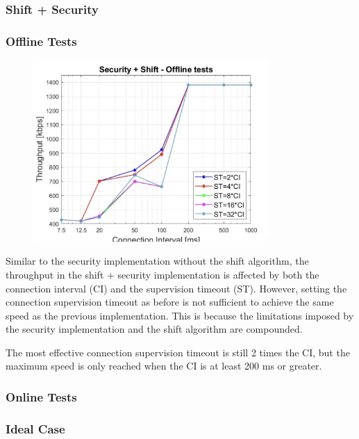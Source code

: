 \documentclass{Configuration_Files/PoliMi3i_thesis}
\begin{document}
\subsubsection*{Shift + Security}
\subsubsection*{Offline Tests}

\begin{figure}[H]
    \centering
    \includegraphics[width=0.8\textwidth]{Results Manuel/figure22}
    \label{fig:figure1}
\end{figure}

Similar to the security implementation without the shift algorithm, the throughput in the shift + security implementation is affected by both the connection interval (CI) and the supervision timeout (ST). However, setting the connection supervision timeout as before is not sufficient to achieve the same speed as the previous implementation. This is because the limitations imposed by the security implementation and the shift algorithm are compounded.

The most effective connection supervision timeout is still 2 times the CI, but the maximum speed is only reached when the CI is at least 200 ms or greater.

\subsubsection*{Online Tests}
\subsubsection*{Ideal Case}
\end{document}
